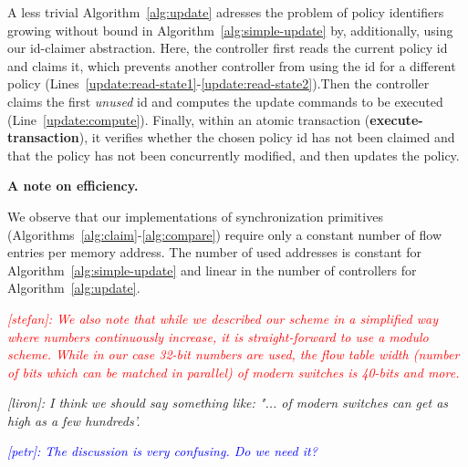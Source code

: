 \documentclass[conference]{sigcomm-alternate}
\newcommand{\stefan}[1]{\textit{\textcolor{red}{[stefan]: #1}}} %
\newcommand{\liron}[1]{\textit{\textcolor{mypurple}{[liron]: #1}}} %
\newcommand{\petr}[1]{\textit{\textcolor{blue}{[petr]: #1}}} %
\newcommand{\execatomic}{\textbf{execute-transaction}}
\begin{document}
A less trivial Algorithm~\ref{alg:update} adresses the problem of
policy identifiers growing without bound in  
Algorithm~\ref{alg:simple-update} by, additionally, using our id-claimer abstraction.
Here, the controller first reads the current policy id and 
claims it, which prevents another controller from using the id 
for a different policy (Lines~\ref{update:read-state1}-\ref{update:read-state2}).Then the controller claims the first \emph{unused} id and computes the update commands to be executed (Line~\ref{update:compute}).
Finally, within an atomic transaction (\textbf{\execatomic}), it verifies whether the chosen policy id has not
been claimed and that
the policy has not been concurrently modified, and then updates the
policy.

\vspace{1mm}
\noindent\textbf{A note on efficiency.}

We observe that our implementations of synchronization primitives
(Algorithms~\ref{alg:claim}-\ref{alg:compare}) 
require only a constant number of flow entries per memory address.
The number of used addresses is constant for  
Algorithm~\ref{alg:simple-update} and linear in the number of
controllers for Algorithm~\ref{alg:update}. 

\stefan{We also note that while we described our scheme in a simplified
way where numbers continuously increase, it is straight-forward to use a modulo
scheme. While in our case 32-bit numbers are used, 
the flow table width (number of bits which can be matched in parallel)
of modern switches is 40-bits and more.}

 \liron{I think we should say something like: "... of modern switches can get as high as a few hundreds'. }

\petr{The discussion is very confusing. Do we need it?}  
\end{document}
